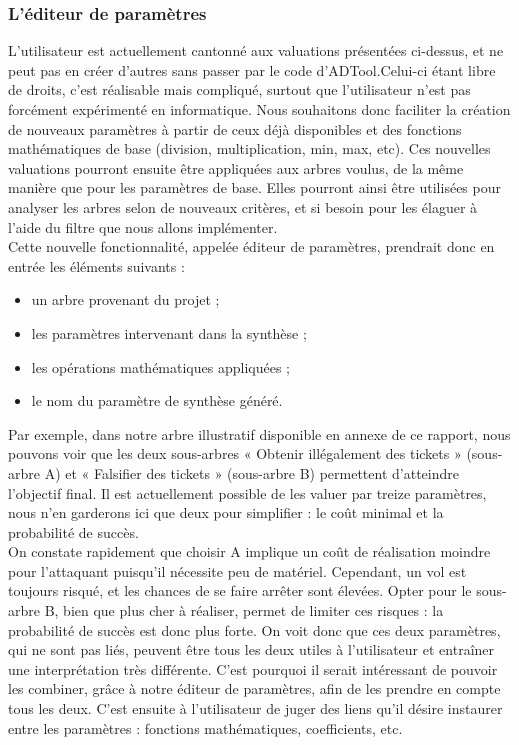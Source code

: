 \subsubsection{L'éditeur de paramètres}
\label{subsec::EditParam}

L'utilisateur est actuellement cantonné aux valuations présentées ci-dessus, et ne peut pas en créer d'autres sans passer par le code d'ADTool.Celui-ci étant libre de droits, c'est réalisable mais compliqué, surtout que l'utilisateur n'est pas forcément expérimenté en informatique. %
Nous souhaitons donc faciliter la création de nouveaux paramètres à partir de ceux déjà disponibles et des fonctions mathématiques de base (division, multiplication, min, max, etc). Ces nouvelles valuations pourront ensuite être appliquées aux arbres voulus, de la même manière que pour les paramètres de base. Elles pourront ainsi être utilisées pour analyser les arbres selon de nouveaux critères, et si besoin pour les élaguer à l'aide du filtre que nous allons implémenter.\\

Cette nouvelle fonctionnalité, appelée éditeur de paramètres, prendrait donc en entrée les éléments suivants :
\begin{itemize}[label=,font=\color{magenta},parsep=0cm,itemsep=0cm, leftmargin=0cm]
\item un arbre provenant du projet ;
\item les paramètres intervenant dans la synthèse ;
\item les opérations mathématiques appliquées ;
\item le nom du paramètre de synthèse généré.
\end{itemize}

Par exemple, dans notre arbre illustratif disponible en annexe de ce rapport, nous pouvons voir que les deux sous-arbres « Obtenir illégalement des tickets » (sous-arbre A) et « Falsifier des tickets » (sous-arbre B) permettent d'atteindre l'objectif final. Il est actuellement possible de les valuer par treize paramètres, nous n'en garderons ici que deux pour simplifier : le coût minimal et la probabilité de succès.\\

On constate rapidement que choisir A implique un coût de réalisation moindre pour l'attaquant puisqu'il nécessite peu de matériel. Cependant, un vol est toujours risqué, et les chances de se faire arrêter sont élevées. Opter pour le sous-arbre B, bien que plus cher à réaliser, permet de limiter ces risques : la probabilité de succès est donc plus forte. On voit donc que ces deux paramètres, qui ne sont pas liés, peuvent être tous les deux utiles à l'utilisateur et entraîner une interprétation très différente. C'est pourquoi il serait intéressant de pouvoir les combiner, grâce à notre éditeur de paramètres, afin de les prendre en compte tous les deux. C'est ensuite à l'utilisateur de juger des liens qu'il désire instaurer entre les paramètres : fonctions mathématiques, coefficients, etc.
